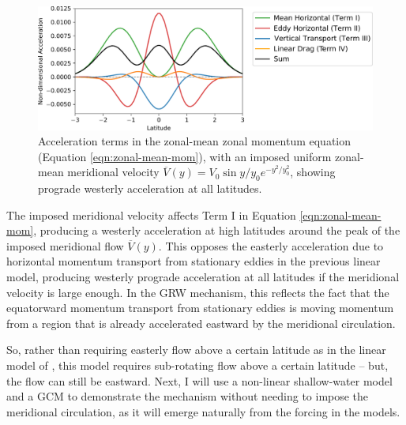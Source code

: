 \begin{figure}
  \centering
  \includegraphics[width=1.0\textwidth]{figures/eqm-zonal-flow/beta-fluxes-plus-merid.pdf}
  \caption{Acceleration terms in the zonal-mean zonal momentum equation (Equation \ref{eqn:zonal-mean-mom}), with an imposed uniform zonal-mean meridional velocity $\overline{V}(y) = V_{0} \sin{y/y_{0}} e^{-y^{2}/y_{0}^{2}}$, showing prograde westerly acceleration at all latitudes.}
  \label{fig:beta-fluxes-plus-merid}
\end{figure}


The imposed meridional velocity affects Term I in Equation \ref{eqn:zonal-mean-mom}, producing a westerly acceleration at high latitudes around the peak of the imposed meridional flow $\overline{V}(y)$. This opposes the easterly acceleration due to horizontal momentum transport from stationary eddies in the previous linear model, producing westerly prograde acceleration at all latitudes if the meridional velocity is large enough. In the GRW mechanism, this reflects the fact that the equatorward momentum transport from stationary eddies is moving momentum from a region that is already accelerated eastward by the meridional circulation.

So, rather than requiring easterly flow above a certain latitude as in the linear model of \citet{showman2011superrotation}, this model requires sub-rotating flow above a certain latitude -- but, the flow can still be eastward. Next, I will use a non-linear shallow-water model and a GCM to demonstrate the mechanism without needing to impose the meridional circulation, as it will emerge naturally from the forcing in the models.

